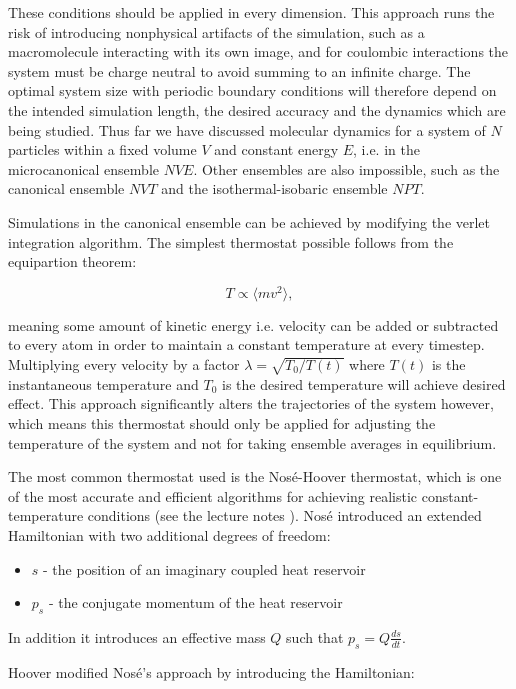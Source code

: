 These conditions should be applied in every dimension.
This approach runs the risk of introducing nonphysical artifacts
of the simulation, such as a macromolecule interacting with its own image,
and for coulombic interactions the system must be charge neutral to avoid
summing to an infinite charge.
The optimal system size with periodic boundary conditions
will therefore depend on the intended simulation length, the desired accuracy
and the dynamics which are being studied.
\newline
\newline
Thus far we have discussed molecular dynamics for a system of $N$ particles
within a fixed volume $V$ and constant energy $E$, i.e. in the
microcanonical ensemble $NVE$. Other ensembles are also impossible,
such as the canonical ensemble $NVT$ and the isothermal-isobaric ensemble
$NPT$.
\par
Simulations in the canonical ensemble can be achieved by modifying the verlet
integration algorithm. The simplest thermostat possible
follows from the equipartion theorem:

$$ T \propto \langle mv^2 \rangle , $$

meaning some amount of kinetic energy i.e. velocity
can be added or subtracted to every atom in order to maintain
a constant temperature at every timestep.
Multiplying every velocity by a factor $\lambda = \sqrt{T_0 / T(t)}$
where $T(t)$ is the instantaneous temperature and $T_0$
is the desired temperature will achieve desired effect.
This approach significantly alters the trajectories of the system however,
which means this thermostat should only be applied for adjusting
the temperature of the system and not for taking ensemble averages
in equilibrium.
\par
The most common thermostat used is the Nosé-Hoover thermostat,
which is one of the most accurate and efficient algorithms
for achieving realistic constant-temperature conditions
(see the lecture notes \parencite[Shell, M. Scott]{che210D2012}).
Nosé introduced an extended Hamiltonian with two additional degrees of freedom:

\begin{itemize}
    \item $s$ - the position of an imaginary coupled heat reservoir
    \item $p_s$ - the conjugate momentum of the heat reservoir
\end{itemize}

In addition it introduces an effective mass $Q$ such that $p_s = Q\frac{ds}{dt}$.
\par
Hoover modified Nosé's approach by introducing the Hamiltonian:

